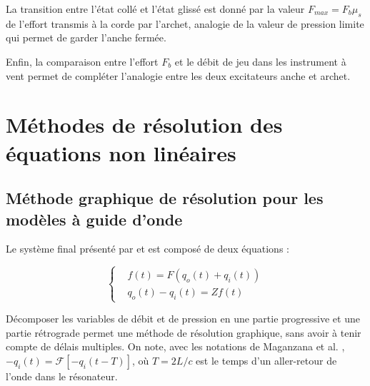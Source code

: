 \documentclass[atiam, article]{rapport} %
\begin{document}
La transition entre l'état collé et l'état glissé est donné par la valeur $F_{max} = F_b \mu_s$ de l'effort transmis à la corde par l'archet, analogie de la valeur de pression limite qui permet de garder l'anche fermée.

Enfin, la comparaison entre l'effort $F_b$ et le débit de jeu dans les instrument à vent permet de compléter l'analogie entre les deux excitateurs anche et archet.

\section{Méthodes de résolution des équations non linéaires}\label{sec : méthode de résolution des equations non linéaires}

\subsection{Méthode graphique de résolution pour les modèles à guide d'onde}

Le système final présenté par \cite{mcintyre_oscillations_1983} et \cite{maganza_bifurcations_1986} est composé de deux équations :

\begin{equation}
    \left\{\begin{split}
        &f(t)=F(q_o(t)+q_i(t))\\
        &q_o(t) - q_i(t) = Zf(t)
    \end{split}
    \right.
\label{eq:sys_guide}
\end{equation}

Décomposer les variables de débit et de pression en une partie progressive et une partie rétrograde permet une méthode de résolution graphique, sans avoir à tenir compte de délais multiples.
On note, avec les notations de Maganzana et al. \cite{maganza_bifurcations_1986}, $-q_i(t) = \mathcal{F}[-q_i(t-T)]$, où $T=2L/c$ est le temps d'un aller-retour de l'onde dans le résonateur.
\end{document}
